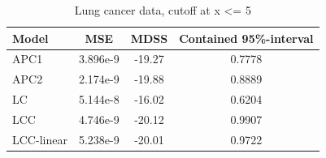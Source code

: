 \begin{table}[h!]
    \begin{center}
        \begin{tabular}{l |c c c }
            Model & MSE &   MDSS & Contained 95\%-interval\\
            \hline
            APC1    & 3.896e-9 & -19.27    & 0.7778 \\
            APC2    & 2.174e-9 & -19.88    & 0.8889 \\
            LC      & 5.144e-8 & -16.02    & 0.6204 \\
            LCC     & 4.746e-9 & -20.12    & 0.9907 \\
            LCC-linear      & 5.238e-9 & -20.01    & 0.9722 \\
        \end{tabular}
        \caption{Lung cancer data, cutoff at x <= 5}\label{tbl:uv-lung-5}
    \end{center}
\end{table}

